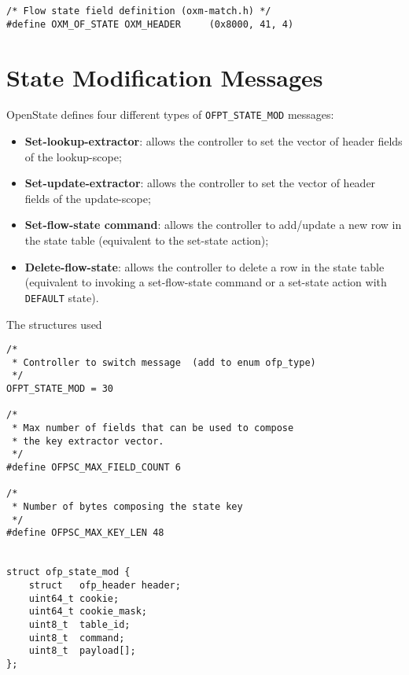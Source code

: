 \begin{verbatim}
/* Flow state field definition (oxm-match.h) */
#define OXM_OF_STATE OXM_HEADER     (0x8000, 41, 4)
\end{verbatim}

\section{State Modification Messages}
\label{sec:msg_set_state}

OpenState defines four different types of \texttt{OFPT\_STATE\_MOD} messages: 
\begin{itemize}
\setlength\itemsep{0em}
\item \textbf{Set-lookup-extractor}: allows the controller to set the vector of header fields of the lookup-scope;
\item \textbf{Set-update-extractor}: allows the controller to set the vector of header fields of the update-scope;
\item \textbf{Set-flow-state command}: allows the controller to add/update a new row in the state table (equivalent to the set-state action);
\item \textbf{Delete-flow-state}: allows the controller to delete a row in the state table (equivalent to invoking a  set-flow-state command or a set-state action with \texttt{DEFAULT} state).
\end{itemize}

The structures used

\begin{verbatim}
/*
 * Controller to switch message  (add to enum ofp_type)
 */
OFPT_STATE_MOD = 30

/*
 * Max number of fields that can be used to compose
 * the key extractor vector.
 */
#define OFPSC_MAX_FIELD_COUNT 6

/*
 * Number of bytes composing the state key
 */
#define OFPSC_MAX_KEY_LEN 48


struct ofp_state_mod {
    struct   ofp_header header;
    uint64_t cookie;
    uint64_t cookie_mask;
    uint8_t  table_id;
    uint8_t  command;
    uint8_t  payload[];
};
\end{verbatim}


